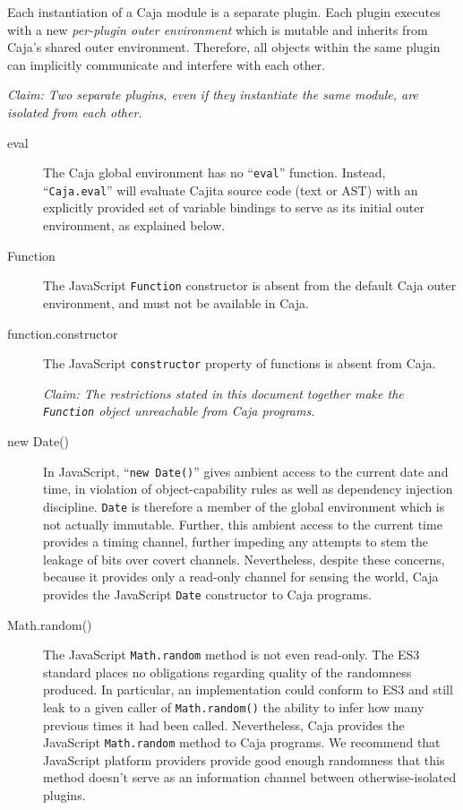 \documentclass[letterpaper,twocolumn,10pt]{article}
\newcommand{\code}[1]{{\tt {#1}}}              %
\begin{document}
Each instantiation of a Caja module is a separate plugin. Each plugin 
executes with a new \emph{per-plugin outer environment} which is mutable and 
inherits from Caja's shared outer environment. Therefore, all objects within 
the same plugin can implicitly communicate and interfere with each other. 

\emph{Claim: Two separate plugins, even if they instantiate the same module, 
are isolated from each other.}


\begin{description}

    \item[eval] The Caja global environment has no ``\code{eval}'' function. 
    Instead, ``\code{Caja.eval}'' will evaluate Cajita source code (text or 
    AST) with an explicitly provided set of variable bindings to serve as its 
    initial outer environment, as explained below.
    
    \item[Function] The JavaScript \code{Function} constructor is absent from 
    the default Caja outer environment, and must not be available in Caja.
    
    \item[function.constructor] The JavaScript \code{constructor} property of 
    functions is absent from Caja.
    
    \emph{Claim: The restrictions stated in this document together make the 
    \code{Function} object unreachable from Caja programs.}

    \item[new Date()] In JavaScript, ``\code{new Date()}''  gives ambient 
    access to the current date and time, in violation of object-capability 
    rules as well as dependency injection discipline. \code{Date} is 
    therefore a member of the global environment which is not actually 
    immutable. Further, this ambient access to the current time provides a 
    timing channel, further impeding any attempts to stem the leakage of bits 
    over covert channels. Nevertheless, despite these concerns, because it 
    provides only a read-only channel for sensing the world, Caja provides 
    the JavaScript \code{Date} constructor to Caja programs.

    \item[Math.random()] The JavaScript \code{Math.random} method is not even 
    read-only. The ES3 standard places no obligations regarding quality of the
    randomness produced. In particular, an implementation could conform to ES3
    and still leak to a given caller of \code{Math.random()} the ability to
    infer how many previous times it had been called. Nevertheless, Caja
    provides the JavaScript \code{Math.random} method to Caja programs. We
    recommend that JavaScript platform providers provide good enough
    randomness that this method doesn't serve as an information channel
    between otherwise-isolated plugins.
    
\end{description}
\end{document}
